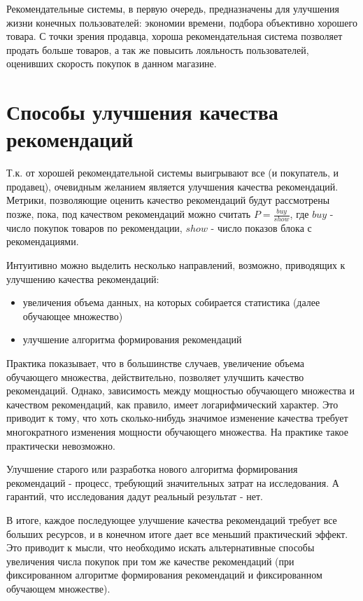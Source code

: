 \documentclass[12pt,a4paper]{report}
\begin{document}
Рекомендательные системы, в первую очередь, предназначены для улучшения жизни конечных пользователей: экономии времени, подбора объективно хорошего товара. С точки зрения продавца, хороша рекомендательная система позволяет продать больше товаров, а так же повысить лояльность пользователей, оценивших скорость покупок в данном магазине.

\section{Способы улучшения качества рекомендаций}
Т.к. от хорошей рекомендательной системы выигрывают все (и покупатель, и продавец), очевидным желанием является улучшения качества рекомендаций.
Метрики, позволяющие оценить качество рекомендаций будут рассмотрены позже, пока, под качеством рекомендаций можно считать $P=\frac{buy}{show}$, где $buy$ - число покупок товаров по рекомендации, $show$ - число показов блока с рекомендациями.

Интуитивно можно выделить несколько направлений, возможно, приводящих к улучшению качества рекомендаций:
\begin{itemize}
\item увеличения объема данных, на которых собирается статистика (далее обучающее множество)
\item улучшение алгоритма формирования рекомендаций
\end{itemize}
Практика показывает, что в большинстве случаев, увеличение объема обучающего множества, действительно, позволяет улучшить качество рекомендаций. Однако, зависимость между мощностью обучающего множества и качеством рекомендаций, как правило, имеет логарифмический характер. Это приводит к тому, что хоть сколько-нибудь значимое изменение качества требует многократного изменения мощности обучающего множества. На практике такое практически невозможно.


Улучшение старого или разработка нового алгоритма формирования рекомендаций - процесс, требующий значительных затрат на исследования. А гарантий, что исследования дадут реальный результат - нет.

В итоге, каждое последующее улучшение качества рекомендаций требует все больших ресурсов, и в конечном итоге дает все меньший практический эффект.
Это приводит к мысли, что  необходимо искать альтернативные способы увеличения числа покупок при том же качестве рекомендаций (при фиксированном алгоритме формирования рекомендаций и фиксированном обучающем множестве).
\end{document}
